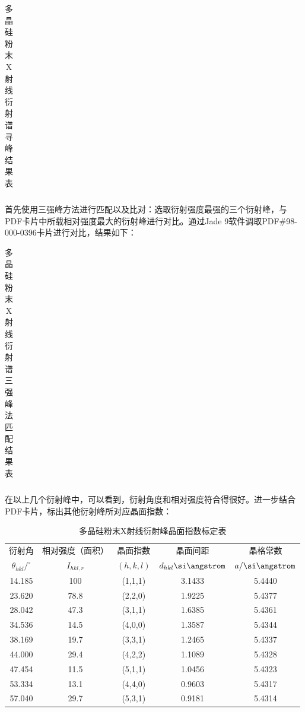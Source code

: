 \documentclass{thuemp}
\begin{document}
\begin{table}[H]
    \centering
    \captionnamefont{\wuhao\bf\heiti}
    \captiontitlefont{\wuhao\bf\heiti}
    \caption{多晶硅粉末X射线衍射谱寻峰结果表}
    \label{tab:si_xrd}
    \liuhao
    \begin{tabular}{ccccc}
        \toprule
        \midrule
        \bottomrule
    \end{tabular}
\end{table}

首先使用三强峰方法进行匹配以及比对：选取衍射强度最强的三个衍射峰，与PDF卡片中所载相对强度最大的衍射峰进行对比。通过Jade 9软件调取PDF\#98-000-0396卡片进行对比，结果如下：

\begin{table}[H]
    \centering
    \captionnamefont{\wuhao\bf\heiti}
    \captiontitlefont{\wuhao\bf\heiti}
    \caption{多晶硅粉末X射线衍射谱三强峰法匹配结果表}
    \label{tab:si_xrd_tri_comp}
    \liuhao
    \begin{tabular}{ccccc}
        \toprule
        \midrule
        \bottomrule
    \end{tabular}
\end{table}

在以上几个衍射峰中，可以看到，衍射角度和相对强度符合得很好。进一步结合PDF卡片，标出其他衍射峰所对应晶面指数：

\begin{table}[H]
    \centering
    \captionnamefont{\wuhao\bf\heiti}
    \captiontitlefont{\wuhao\bf\heiti}
    \caption{多晶硅粉末X射线衍射峰晶面指数标定表}
    \label{tab:si_xrd_indexed}
    \liuhao
    \begin{tabular}{ccccc}
        \toprule
        衍射角 & 相对强度（面积）& 晶面指数 & 晶面间距 & 晶格常数 \\
        $\theta_{hkl}/^\circ$ & $I_{hkl,r}$ & $(h,k,l)$ & $d_{hkl}\text{\si\angstrom}$ & $a/\text{\si\angstrom}$ \\
        \midrule
        14.185 &  100 & (1,1,1) & 3.1433 & 5.4440 \\
        23.620 & 78.8 & (2,2,0) & 1.9225 & 5.4377 \\
        28.042 & 47.3 & (3,1,1) & 1.6385 & 5.4361 \\
        34.536 & 14.5 & (4,0,0) & 1.3587 & 5.4344 \\
        38.169 & 19.7 & (3,3,1) & 1.2465 & 5.4337 \\
        44.000 & 29.4 & (4,2,2) & 1.1089 & 5.4328 \\
        47.454 & 11.5 & (5,1,1) & 1.0456 & 5.4323 \\
        53.334 & 13.1 & (4,4,0) & 0.9603 & 5.4317 \\
        57.040 & 29.7 & (5,3,1) & 0.9181 & 5.4314 \\
        \bottomrule
    \end{tabular}
\end{table}
\end{document}
